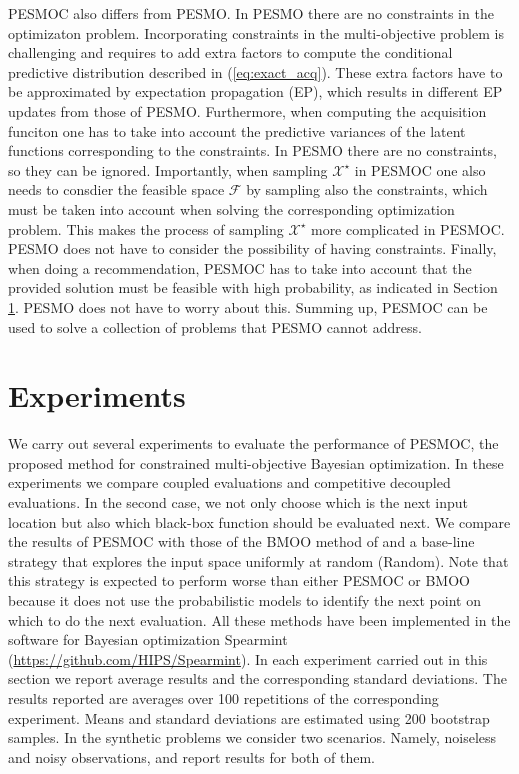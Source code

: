 \documentclass[review,preprint,12pt]{elsarticle}
\begin{document}
PESMOC also differs from PESMO. In PESMO there are no constraints in the optimizaton problem. Incorporating
constraints in the multi-objective problem is challenging and requires to add extra factors to compute the
conditional predictive distribution described in (\ref{eq:exact_acq}). These extra factors have to be approximated
by expectation propagation (EP), which results in different EP updates from those of PESMO. Furthermore, when computing the 
acquisition funciton one has to take into account the predictive variances of the latent functions corresponding to the constraints.
In PESMO there are no constraints, so they can be ignored. Importantly, when sampling $\mathcal{X}^\star$ in PESMOC one
also needs to consdier the feasible space $\mathcal{F}$ by sampling also the constraints, which must be taken into account when
solving the corresponding optimization problem. This makes the process of sampling $\mathcal{X}^\star$ more complicated in PESMOC. PESMO does not have to 
consider the possibility of having constraints. Finally, when doing a recommendation, PESMOC has to take into account that the 
provided solution must be feasible with high probability, as indicated in Section \ref{sec:experiments}. PESMO does not have to worry 
about this. Summing up, PESMOC can be used to solve a collection of problems that PESMO cannot address.

\section{Experiments}
\label{sec:experiments}

We carry out several experiments to evaluate the performance of PESMOC, the proposed method for 
constrained multi-objective Bayesian optimization. In these experiments we compare coupled evaluations 
and competitive decoupled evaluations. In the second case, we not only choose which is the next input 
location but also which black-box function should be evaluated next. We compare the results of PESMOC with 
those of the BMOO method of \cite{feliot2015bayesian} and a base-line strategy that explores the input space 
uniformly at random (Random). Note that this strategy is expected to perform worse than either PESMOC or BMOO because 
it does not use the probabilistic models to identify the next point on which to do the next evaluation. All these methods have 
been implemented in the software for Bayesian optimization Spearmint (\url{https://github.com/HIPS/Spearmint}). 
In each experiment carried out in this section we report average results and the corresponding standard deviations.
The results reported are averages over 100 repetitions of the corresponding experiment. Means and standard 
deviations are estimated using 200 bootstrap samples. In the synthetic problems we consider two scenarios. Namely, 
noiseless and noisy observations, and report results for both of them.
\end{document}
